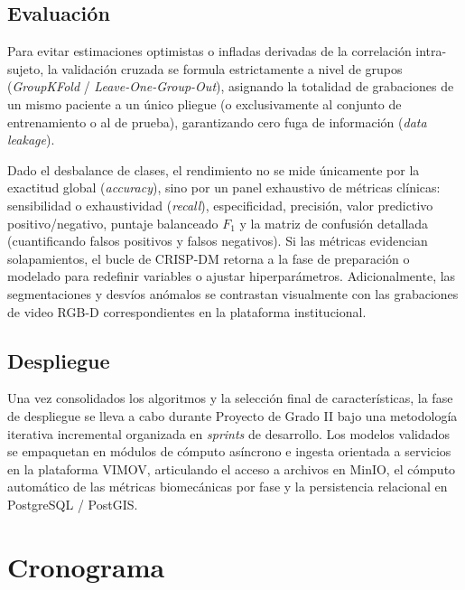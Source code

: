 \documentclass[12pt,a4paper]{article}
\begin{document}
\subsection{Evaluación}\label{sec:met-evaluacion}

Para evitar estimaciones optimistas o infladas derivadas de la correlación intra-sujeto, la validación cruzada se formula estrictamente a nivel de grupos (\emph{GroupKFold} / \emph{Leave-One-Group-Out}), asignando la totalidad de grabaciones de un mismo paciente a un único pliegue (o exclusivamente al conjunto de entrenamiento o al de prueba), garantizando cero fuga de información (\emph{data leakage}).

Dado el desbalance de clases, el rendimiento no se mide únicamente por la exactitud global (\emph{accuracy}), sino por un panel exhaustivo de métricas clínicas: sensibilidad o exhaustividad (\emph{recall}), especificidad, precisión, valor predictivo positivo/negativo, puntaje balanceado $F_1$ y la matriz de confusión detallada (cuantificando falsos positivos y falsos negativos). Si las métricas evidencian solapamientos, el bucle de CRISP-DM retorna a la fase de preparación o modelado para redefinir variables o ajustar hiperparámetros. Adicionalmente, las segmentaciones y desvíos anómalos se contrastan visualmente con las grabaciones de video RGB-D correspondientes en la plataforma institucional.

\subsection{Despliegue}\label{sec:met-despliegue}

Una vez consolidados los algoritmos y la selección final de características, la fase de despliegue se lleva a cabo durante Proyecto de Grado II bajo una metodología iterativa incremental organizada en \emph{sprints} de desarrollo. Los modelos validados se empaquetan en módulos de cómputo asíncrono e ingesta orientada a servicios en la plataforma VIMOV, articulando el acceso a archivos en MinIO, el cómputo automático de las métricas biomecánicas por fase y la persistencia relacional en PostgreSQL / PostGIS.

\section{Cronograma}\label{sec:cronograma}
\end{document}
